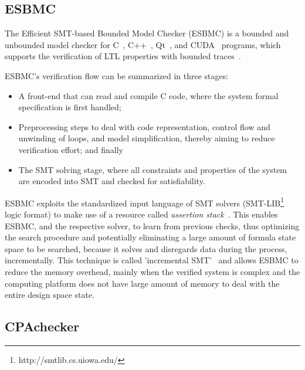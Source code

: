 \subsection{ESBMC}

The Efficient SMT-based Bounded Model Checker (ESBMC) is a bounded and unbounded model checker for C~\cite{esbmc2018}, C++~\cite{RamalhoFSMC013}, Qt~\cite{MonteiroGCF17}, and CUDA~\cite{PereiraASMMFC17} programs, which supports the verification of LTL properties with bounded traces~\cite{DBLP:journals/sosym/MorseCN015}. 

ESBMC's verification flow can be summarized in three stages: 

\begin{itemize}
\item A front-end that can read and compile C code, where the system formal specification is first handled; 
\item Preprocessing steps to deal with code representation, control flow and unwinding of loops, and model simplification, thereby aiming to reduce verification effort; and finally 
\item The SMT solving stage, where all constraints and properties of the system are encoded into SMT and checked for satisfiability.
\end{itemize}
 
ESBMC exploits the standardized input language of SMT solvers (SMT-LIB\footnote{http://smtlib.cs.uiowa.edu/} logic format) to make use of a resource called \textit{assertion stack}~\cite{Morse2015}. This enables ESBMC, and the respective solver, to learn from previous checks, thus optimizing the search procedure and potentially eliminating a large amount of formula state space to be searched, because it solves and disregards data during the process, incrementally. This technique is called 'incremental SMT'~\cite{DBLP:journals/fac/SchrammelKBMTB17} and allows ESBMC to reduce the memory overhead, mainly when the verified system is complex and the computing platform does not have large amount of memory to deal with the entire design space state.

\subsection{CPAchecker}

